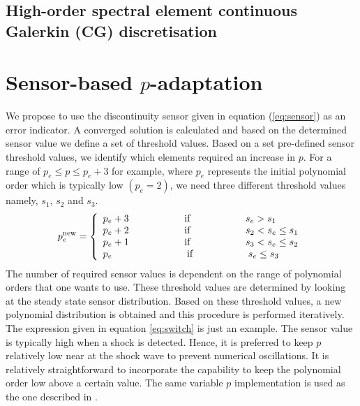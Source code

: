 \documentclass[review]{elsarticle}
\begin{document}
\subsection{High-order spectral element continuous Galerkin (CG) discretisation}   

\section{Sensor-based $p$-adaptation}
\par We propose to use the discontinuity sensor given in equation (\ref{eq:sensor}) as an error indicator. A converged solution is calculated and based on the determined sensor value we define a set of threshold values. 
Based on a set  pre-defined sensor threshold values, we identify which elements required an increase in $p$.
For a range of $p_e \leq p \leq p_e+3$ for example, where $p_e$ represents the initial polynomial order which is typically low $(p_e = 2)$, we need three different threshold values namely, $s_1$, $s_2$ and $s_3$. 
\begin{equation*}\label{eq:switch}
   p^{\text{new}}_e
=\left \{ \begin{array}{l}
    p_e+3\hspace{20mm} \mbox{if}\hspace{20mm} s_e>s_{1}\\  
    p_e+2\hspace{20mm} \mbox{if}\hspace{20mm} s_{2}<s_e\leq s_{1}\\
    p_e+1\hspace{20mm} \mbox{if}\hspace{20mm} s_{3}<s_e\leq s_{2}\\
    p_e\hspace{27mm} \mbox{if}\hspace{20mm} s_e\leq s_{3}
    \end{array} 
    \right.
\end{equation*}
The number of required sensor values is dependent on the range of polynomial orders that 
one wants to use. 
These threshold values are determined by 
looking at the steady state sensor distribution. 
Based on these threshold values, 
a new polynomial distribution is obtained and this procedure is performed iteratively.
The expression given in equation \ref{eq:switch} is just an example.
The sensor value is typically high when a shock is detected. 
Hence, it is preferred to keep $p$ relatively low near at the shock wave to prevent numerical oscillations.
It is relatively straightforward to incorporate the capability to keep the polynomial order low above a certain value. 
The same variable $p$ implementation is used as the one described in \cite{Ekelschot2016}.
\end{document}
